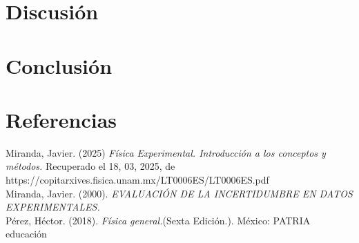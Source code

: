 \documentclass[12pt,a4paper]{article}
\begin{document}
\section{Discusión}

\section{Conclusión}

\section{Referencias}

Miranda, Javier. (2025) \textit{Física Experimental. Introducción a los conceptos y métodos.} Recuperado el 18, 03, 2025, de https://copitarxives.fisica.unam.mx/LT0006ES/LT0006ES.pdf \\

Miranda, Javier. (2000). \textit{EVALUACIÓN DE LA INCERTIDUMBRE EN DATOS EXPERIMENTALES.} \\

Pérez, Héctor. (2018). \textit{Física general.}(Sexta Edición.). México: PATRIA educación \\
\end{document}
